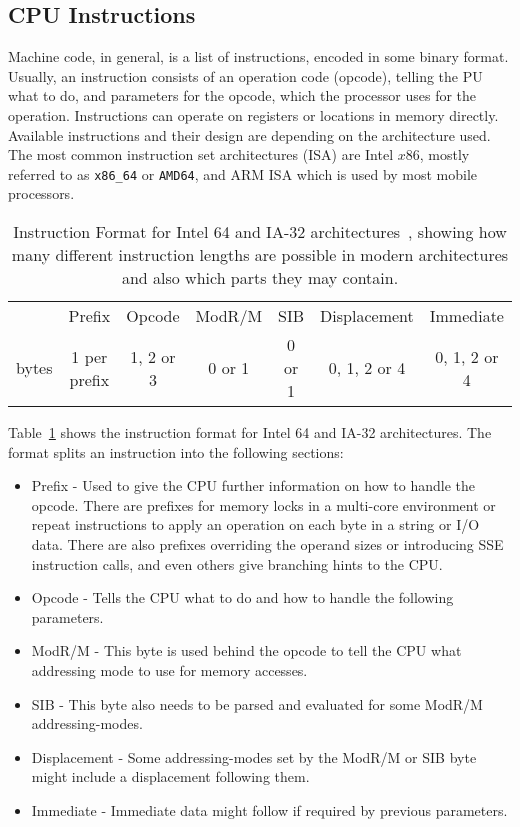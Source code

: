 \subsection{CPU Instructions}

Machine code, in general, is a list of instructions, encoded in some binary
format. Usually, an instruction consists of an operation code (opcode), telling
the PU what to do, and parameters for the opcode, which the processor
uses for the operation. Instructions can operate on registers or locations in
memory directly. Available instructions and their design are depending on the
architecture used. The most common instruction set architectures (ISA) are Intel
$x86$, mostly referred to as \texttt{x86\_64} or \texttt{AMD64}, and ARM ISA
which is used by most mobile processors.

\begin{table}[]
\centering
\begin{tabular}{ccccccc}
\cline{2-7}
\multicolumn{1}{c|}{} & \multicolumn{1}{c|}{Prefix} &
\multicolumn{1}{c|}{Opcode} & \multicolumn{1}{c|}{ModR/M} &
\multicolumn{1}{c|}{SIB} & \multicolumn{1}{c|}{Displacement} &
\multicolumn{1}{c|}{Immediate} \\ \cline{2-7}
bytes         & 1 per prefix                & 1, 2 or 3
 & 0 or 1                      & 0 or 1                   & 0, 1, 2 or 4
             & 0, 1, 2 or 4
\end{tabular}
\caption{Instruction Format for Intel 64 and IA-32
architectures~\cite{intelsys}, showing how many different instruction lengths
are possible in modern architectures and also which parts they may contain.}
\label{tab:instrfor}
\end{table}

Table~\ref{tab:instrfor} shows the instruction format for Intel 64 and IA-32
architectures. The format splits an instruction into the following sections:

\begin{itemize}
  \item Prefix - Used to give the CPU further information on how to handle the
opcode. There are prefixes for memory locks in a multi-core environment or
repeat instructions to apply an operation on each byte in a string or I/O data.
There are also prefixes overriding the operand sizes or introducing SSE
instruction calls, and even others give branching hints to the CPU.
  \item Opcode - Tells the CPU what to do and how to handle the following
parameters.
  \item ModR/M - This byte is used behind the opcode to tell the CPU what
addressing mode to use for memory accesses.
  \item SIB - This byte also needs to be parsed and evaluated for some ModR/M
addressing-modes.
  \item Displacement - Some addressing-modes set by the ModR/M or SIB byte
might include a displacement following them.
  \item Immediate - Immediate data might follow if required by previous
parameters.
\end{itemize}

